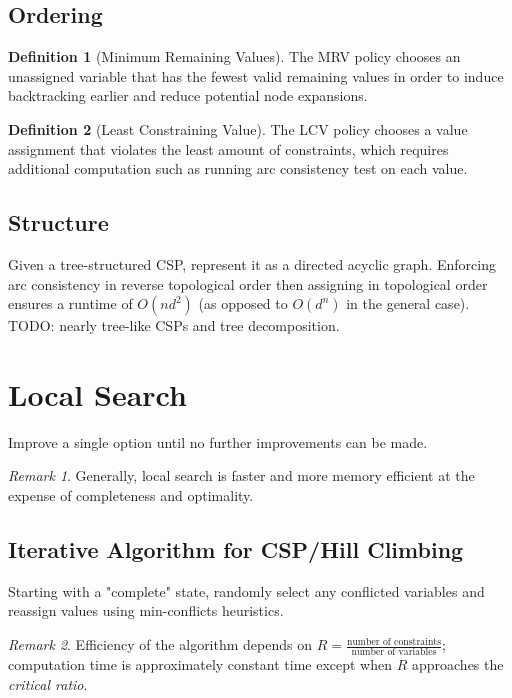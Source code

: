 \documentclass[11pt]{article}
\theoremstyle{definition}
\newtheorem{definition}{Definition}[section]
\theoremstyle{remark}
\newtheorem*{remark}{Remark}
\begin{document}
\subsection{Ordering}
\begin{definition}[Minimum Remaining Values]
The MRV policy chooses an unassigned variable that has the fewest valid remaining values in order to induce backtracking earlier and reduce potential node expansions.
\end{definition}

\begin{definition}[Least Constraining Value]
The LCV policy chooses a value assignment that violates the least amount of constraints, which requires additional computation such as running arc consistency test on each value.
\end{definition}

\subsection{Structure}
Given a tree-structured CSP, represent it as a directed acyclic graph. Enforcing arc consistency in reverse topological order then assigning in topological order ensures a runtime of $O(nd^2)$  (as opposed to $O(d^n)$ in the general case). \\
TODO: nearly tree-like CSPs and tree decomposition.
\section{Local Search}
Improve a single option until no further improvements can be made.
\begin{remark}
Generally, local search is faster and more memory efficient at the expense of completeness and optimality.
\end{remark}
\subsection{Iterative Algorithm for CSP/Hill Climbing}
Starting with a "complete" state, randomly select any conflicted variables and reassign values using min-conflicts heuristics.
\begin{remark}
Efficiency of the algorithm depends on $R=\tfrac{\text{number of constraints}}{\text{number of variables}}$; computation time is approximately constant time except when $R$ approaches the \textit{critical ratio}.
\end{remark}
\end{document}
